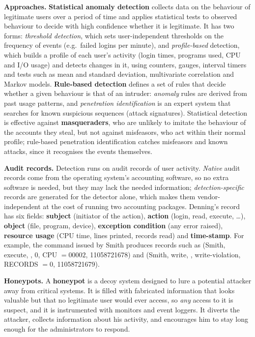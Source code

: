 \textbf{Approaches.} \textbf{Statistical anomaly detection} collects data on the behaviour of legitimate users over a period of time and applies statistical tests to observed behaviour to decide with high confidence whether it is legitimate. It has two forms: \emph{threshold detection}, which sets user-independent thresholds on the frequency of events (e.g.\ failed logins per minute), and \emph{profile-based} detection, which builds a profile of each user's activity (login times, programs used, CPU and I/O usage) and detects changes in it, using counters, gauges, interval timers and tests such as mean and standard deviation, multivariate correlation and Markov models. \textbf{Rule-based detection} defines a set of rules that decide whether a given behaviour is that of an intruder: \emph{anomaly} rules are derived from past usage patterns, and \emph{penetration identification} is an expert system that searches for known suspicious sequences (attack signatures). Statistical detection is effective against \textbf{masqueraders}, who are unlikely to imitate the behaviour of the accounts they steal, but not against misfeasors, who act within their normal profile; rule-based penetration identification catches misfeasors and known attacks, since it recognises the events themselves.

\textbf{Audit records.} Detection runs on audit records of user activity. \emph{Native} audit records come from the operating system's accounting software, so no extra software is needed, but they may lack the needed information; \emph{detection-specific} records are generated for the detector alone, which makes them vendor-independent at the cost of running two accounting packages. Denning's record has six fields: \textbf{subject} (initiator of the action), \textbf{action} (login, read, execute, \dots), \textbf{object} (file, program, device), \textbf{exception condition} (any error raised), \textbf{resource usage} (CPU time, lines printed, records read) and \textbf{time-stamp}. For example, the command  issued by Smith produces records such as (Smith, execute, , 0, CPU $= 00002$, 11058721678) and (Smith, write, , write-violation, RECORDS $= 0$, 11058721679).

\textbf{Honeypots.} A \textbf{honeypot} is a decoy system designed to lure a potential attacker away from critical systems. It is filled with fabricated information that looks valuable but that no legitimate user would ever access, so \emph{any} access to it is suspect, and it is instrumented with monitors and event loggers. It diverts the attacker, collects information about his activity, and encourages him to stay long enough for the administrators to respond.


